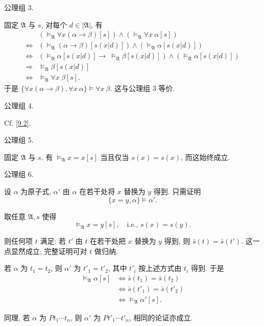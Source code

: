 
\begin{exercise}{10.1}
  公理组 3.
\end{exercise}

固定 $\mathfrak{A}$ 与 $s$, 对每个 $d\in|\mathfrak{A}|$, 有
\begin{align*}
                  & (\vDash_{\mathfrak{A}}\forall x(\alpha\rightarrow \beta)[s])\wedge(\vDash_{\mathfrak{A}}\forall x\ \alpha[s])                    \\
  \Leftrightarrow & (\vDash_{\mathfrak{A}}(\alpha\rightarrow \beta)[s(x|d)])\wedge(\vDash_{\mathfrak{A}} \alpha[s(x|d)])                             \\
  \Leftrightarrow & (\vDash_{\mathfrak{A}}\alpha[s(x|d)]\rightarrow\ \vDash_{\mathfrak{A}}\beta[s(x|d)])\wedge(\vDash_{\mathfrak{A}} \alpha[s(x|d)]) \\
  \Rightarrow     & \vDash_{\mathfrak{A}}\beta[s(x|d)]                                                                                               \\
  \Leftrightarrow & \vDash_{\mathfrak{A}}\forall x\ \beta[s].
\end{align*}
于是 $\{\forall x(\alpha\rightarrow \beta),\forall x\ \alpha\}\vDash\forall x\ \beta$. 这与公理组 3 等价.

\begin{exercise}{10.2}
  公理组 4.
\end{exercise}

Cf. \ref{9.2}.

\begin{exercise}{10.3}
  公理组 5.
\end{exercise}

固定 $\mathfrak A$ 与 $s$. 有 $\vDash_{\mathfrak A}x=x[s]$ 当且仅当 $s(x)=s(x)$, 而这始终成立.

\begin{exercise}{10.4}
  公理组 6.
\end{exercise}

设 $\alpha$ 为原子式, $\alpha'$ 由 $\alpha$ 在若干处将 $x$ 替换为 $y$ 得到. 只需证明
\[
  \{x = y, \alpha\} \vDash \alpha'.
\]

取任意 $\mathfrak{A}, s$ 使得
\[
  \vDash_{\mathfrak{A}} x = y[s], \quad \text{i.e., } s(x) = s(y).
\]

则任何项 $t$ 满足: 若 $t'$ 由 $t$ 在若干处把 $x$ 替换为 $y$ 得到, 则 $\bar{s}(t)=\bar{s}(t')$. 这一点显然成立; 完整证明可对 $t$ 做归纳.

若 $\alpha$ 为 $t_1 = t_2$, 则 $\alpha'$ 为 $t'_1 = t'_2$, 其中 $t'_i$ 按上述方式由 $t_i$ 得到. 于是
\begin{align*}
  \vDash_{\mathfrak{A}} \alpha[s]
   & \iff \bar{s}(t_1) = \bar{s}(t_2)       \\
   & \iff \bar{s}(t'_1) = \bar{s}(t'_2)     \\
   & \iff \vDash_{\mathfrak{A}} \alpha'[s].
\end{align*}

同理, 若 $\alpha$ 为 $P t_1 \cdots t_n$, 则 $\alpha'$ 为 $P t'_1 \cdots t'_n$, 相同的论证亦成立.

